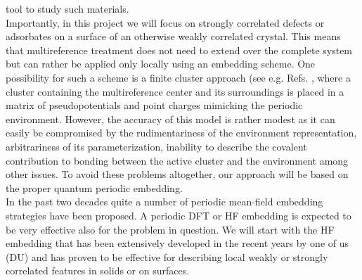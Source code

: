 \documentclass[a4paper,11pt,headings=normal]{scrartcl}
\begin{document}
\begin{itemize}
tool to study such materials. \\
Importantly, in this project we will focus on strongly correlated 
defects or adsorbates on a surface of an otherwise weakly correlated crystal. This 
means that multireference treatment does not need to extend over the complete 
system but can rather be applied only locally using an embedding scheme. 
One possibility for such a scheme is a finite cluster approach (see
e.g. Refs. \cite{Sousa2001,Lepetit2003}, where a cluster containing the
multireference center and its surroundings is placed in a matrix of
pseudopotentials and point charges mimicking the periodic
environment. However, the accuracy of this model is rather modest as it can 
easily be compromised by the rudimentariness of the environment representation, 
arbitrariness of its parameterization, inability to describe the covalent 
contribution to bonding between the active cluster and the environment among 
other issues.\autocite{Lepetit2003} To avoid these problems altogether, our 
approach will be based on the proper quantum periodic embedding.\\
In the past two decades quite a number of periodic mean-field embedding 
strategies have been proposed.\autocite{Jacob08, Manby2012, Libisch2014, 
Goodpaster2014, Jacob2014, Stoyanova2014, masur2016, Libisch2017, usvyat18, 
Chulhai2018, Cui2020, Jones2020, Pham2020, Hegely, WachterLehn2022, schaefer21, 
christlmaier21, Berkelbach21, WachterLehn2022, Lavroff2024}  A periodic DFT or HF 
embedding is expected to be very effective also for the problem in question. We 
will start with the HF embedding that has been extensively developed in the recent 
years by one of us (DU) and has proven to be effective for describing local weakly 
or strongly correlated features in solids or on surfaces.\autocite{masur2016, 
schutz2017, usvyat18, usvyat20, christlmaier21, mullan21, Lavroff2024} 

\end{itemize}
\end{document}

